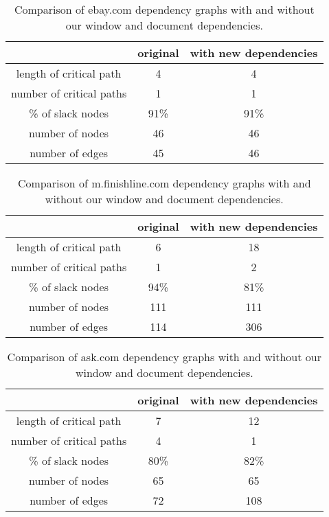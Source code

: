 \begin{table*}[tb]
\centering
\small
\begin{tabular}{|c|c|c|}
\hline
 & original & with new dependencies \\
\hline
length of critical path & 4 & 4 \\
number of critical paths & 1 & 1 \\
\% of slack nodes & 91\% & 91\% \\
number of nodes & 46 & 46 \\
number of edges & 45 & 46 \\
\hline
\end{tabular}\caption{Comparison of ebay.com dependency graphs with and without our window and document dependencies.}
\label{t:ebaygraph}
\end{table*}

\begin{table*}[tb]
\centering
\small
\begin{tabular}{|c|c|c|}
\hline
 & original & with new dependencies \\
\hline
length of critical path & 6 & 18 \\
number of critical paths & 1 & 2 \\
\% of slack nodes & 94\% & 81\% \\
number of nodes & 111 & 111 \\
number of edges & 114 & 306 \\
\hline
\end{tabular}\caption{Comparison of m.finishline.com dependency graphs with and without our window and document dependencies.}
\label{t:finishlinegraph}
\end{table*}


\begin{table*}[tb]
\centering
\small
\begin{tabular}{|c|c|c|}
\hline
 & original & with new dependencies \\
\hline
length of critical path & 7 & 12 \\
number of critical paths & 4 & 1 \\
\% of slack nodes & 80\% & 82\% \\
number of nodes & 65 & 65 \\
number of edges & 72 & 108 \\
\hline
\end{tabular}\caption{Comparison of ask.com dependency graphs with and without our window and document dependencies.}
\label{t:askgraph}
\end{table*}


